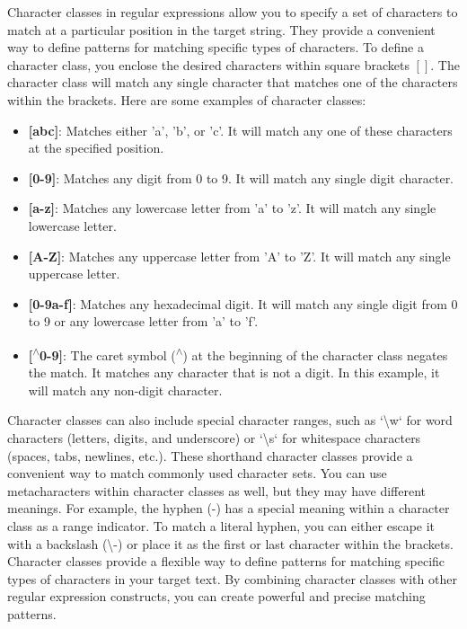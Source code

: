\documentclass{report}
\begin{document}
    Character classes in regular expressions allow you to specify a set of characters to match at a particular position in the target string. They provide a convenient way to define patterns for matching specific types of characters.
    \bigbreak \noindent 
    To define a character class, you enclose the desired characters within square brackets \([ ]\). The character class will match any single character that matches one of the characters within the brackets.
    \bigbreak \noindent 
    Here are some examples of character classes:
    \begin{itemize}
        \item \textbf{[abc]}: Matches either 'a', 'b', or 'c'. It will match any one of these characters at the specified position.
        \item \textbf{[0-9]}: Matches any digit from 0 to 9. It will match any single digit character.
        \item \textbf{[a-z]}: Matches any lowercase letter from 'a' to 'z'. It will match any single lowercase letter.
        \item \textbf{[A-Z]}: Matches any uppercase letter from 'A' to 'Z'. It will match any single uppercase letter.
        \item \textbf{[0-9a-f]}: Matches any hexadecimal digit. It will match any single digit from 0 to 9 or any lowercase letter from 'a' to 'f'.
        \item \textbf{[\textsuperscript{$\wedge$}0-9]}: The caret symbol (\textsuperscript{$\wedge$}) at the beginning of the character class negates the match. It matches any character that is not a digit. In this example, it will match any non-digit character.
    \end{itemize}
    Character classes can also include special character ranges, such as `\textbackslash w` for word characters (letters, digits, and underscore) or `\textbackslash s` for whitespace characters (spaces, tabs, newlines, etc.). These shorthand character classes provide a convenient way to match commonly used character sets.
    \bigbreak \noindent 
    You can use metacharacters within character classes as well, but they may have different meanings. For example, the hyphen (-) has a special meaning within a character class as a range indicator. To match a literal hyphen, you can either escape it with a backslash (\textbackslash -) or place it as the first or last character within the brackets.
    \bigbreak \noindent 
    Character classes provide a flexible way to define patterns for matching specific types of characters in your target text. By combining character classes with other regular expression constructs, you can create powerful and precise matching patterns.
\end{document}
